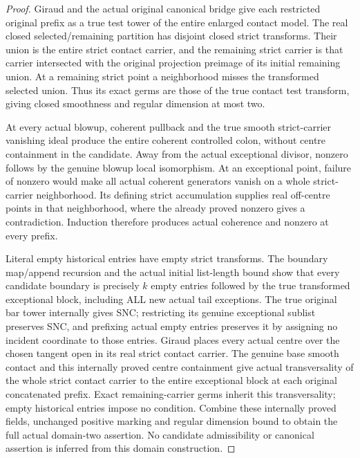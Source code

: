 \begin{proof}
Giraud and the actual original canonical bridge give each restricted original
prefix as a true test tower of the entire enlarged contact model. The real
closed selected/remaining partition has disjoint closed strict transforms.
Their union is the entire strict contact carrier, and the remaining strict
carrier is that carrier intersected with the original projection preimage
of its initial remaining union. At a remaining strict point a neighborhood
misses the transformed selected union. Thus its exact germs are those of
the true contact test transform, giving closed smoothness and regular
dimension at most two.

At every actual blowup, coherent pullback and the true smooth strict-carrier
vanishing ideal produce the entire coherent controlled colon, without centre
containment in the candidate. Away from the actual exceptional divisor,
nonzero follows by the genuine blowup local isomorphism. At an exceptional
point, failure of nonzero would make all actual coherent generators vanish
on a whole strict-carrier neighborhood. Its defining strict accumulation
supplies real off-centre points in that neighborhood, where the already
proved nonzero gives a contradiction. Induction therefore produces actual
coherence and nonzero at every prefix.

Literal empty historical entries have empty strict transforms. The boundary
map/append recursion and the actual initial list-length bound show that every
candidate boundary is precisely $k$ empty entries followed by the true
transformed exceptional block, including ALL new actual tail exceptions.
The true original bar tower internally gives SNC; restricting its genuine
exceptional sublist preserves SNC, and prefixing actual empty entries
preserves it by assigning no incident coordinate to those entries. Giraud
places every actual centre over the chosen tangent open in its real strict
contact carrier. The genuine base smooth contact and this internally proved
centre containment give actual transversality of the whole strict contact
carrier to the entire exceptional block at each original concatenated
prefix. Exact remaining-carrier germs inherit this transversality; empty
historical entries impose no condition. Combine these internally proved
fields, unchanged positive marking and regular dimension bound to obtain
the full actual domain-two assertion. No candidate admissibility or canonical
assertion is inferred from this domain construction.
\end{proof}

